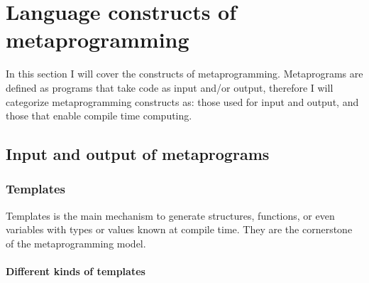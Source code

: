 \documentclass[../main]{subfiles}
\begin{document}
\section{Language constructs of \cpp metaprogramming}

In this section I will cover the constructs of \cpp metaprogramming.
Metaprograms are defined as programs that take code as input and/or output,
therefore I will categorize metaprogramming constructs as:
those used for input and output,
and those that enable compile time computing.

\subsection{Input and output of metaprograms}

\subsubsection{Templates}

Templates is the main \cpp mechanism to generate structures, functions,
or even variables with types or values known at compile time.
They are the cornerstone of the \cpp metaprogramming model.

\paragraph{Different kinds of templates}
\end{document}
